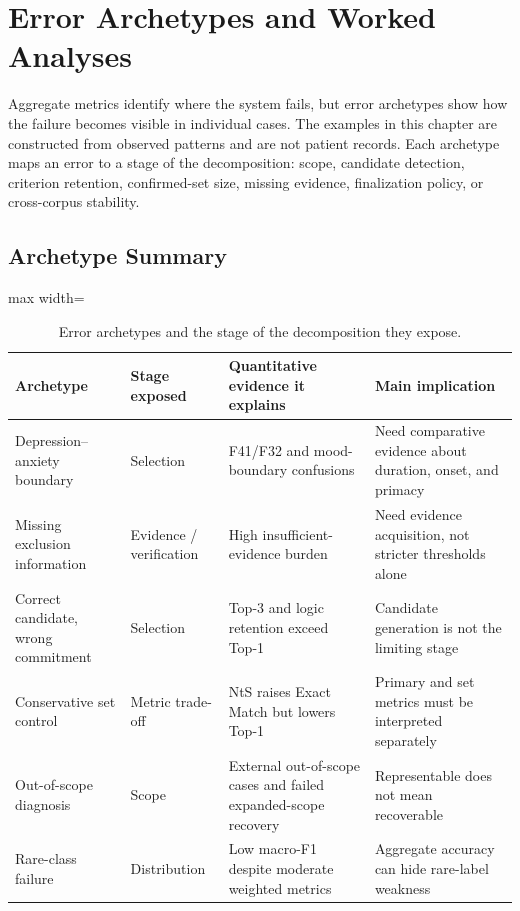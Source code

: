\chapter{Error Archetypes and Worked Analyses}
\label{ch:error}

Aggregate metrics identify where the system fails, but error archetypes show how the failure becomes visible in individual cases. The examples in this chapter are constructed from observed patterns and are not patient records. Each archetype maps an error to a stage of the decomposition: scope, candidate detection, criterion retention, confirmed-set size, missing evidence, finalization policy, or cross-corpus stability.

\section{Archetype Summary}

\begin{table}[htbp]
\centering
\caption{Error archetypes and the stage of the decomposition they expose.}
\label{tab:error-archetypes-rewrite}
\begin{adjustbox}{max width=\textwidth}
\begin{tabular}{p{3.0cm}p{3.0cm}p{4.2cm}p{4.8cm}}
\toprule
Archetype & Stage exposed & Quantitative evidence it explains & Main implication\\
\midrule
Depression--anxiety boundary & Selection & F41/F32 and mood-boundary confusions & Need comparative evidence about duration, onset, and primacy\\
Missing exclusion information & Evidence / verification & High insufficient-evidence burden & Need evidence acquisition, not stricter thresholds alone\\
Correct candidate, wrong commitment & Selection & Top-3 and logic retention exceed Top-1 & Candidate generation is not the limiting stage\\
Conservative set control & Metric trade-off & NtS raises Exact Match but lowers Top-1 & Primary and set metrics must be interpreted separately\\
Out-of-scope diagnosis & Scope & External out-of-scope cases and failed expanded-scope recovery & Representable does not mean recoverable\\
Rare-class failure & Distribution & Low macro-F1 despite moderate weighted metrics & Aggregate accuracy can hide rare-label weakness\\
\bottomrule
\end{tabular}
\end{adjustbox}
\end{table}

